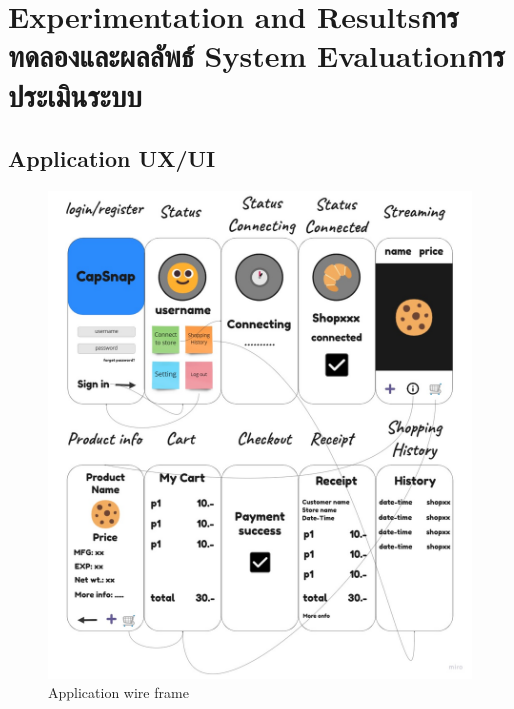 \chapter{\ifproject%
\ifenglish Experimentation and Results\else การทดลองและผลลัพธ์\fi
\else%
\ifenglish System Evaluation\else การประเมินระบบ\fi
\fi}

\section{Application UX/UI}
 
\begin{figure}[h]
    \begin{center}
    \includegraphics[scale=0.25]{pic/ui/mobileui.jpg}
    \end{center}
    
    \caption[Application wire frame]{Application wire frame}
    \label{fig:Application wire frame}
    \end{figure} 


